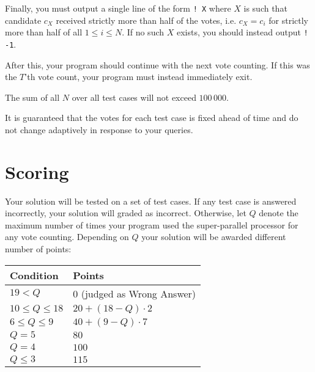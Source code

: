 Finally, you must output a single line of the form \texttt{! X} where $X$ is such that candidate $c_X$ received strictly more than half of the votes, i.e. $c_X = c_i$ for strictly more than half of all $1 \le i \le N$.
If no such $X$ exists, you should instead output \texttt{! -1}.

After this, your program should continue with the next vote counting.
If this was the $T$'th vote count, your program must instead immediately exit.

The sum of all $N$ over all test cases will not exceed $100\,000$.

It is guaranteed that the votes for each test case is fixed ahead of time and do not change adaptively in response to your queries.

\section*{Scoring}
Your solution will be tested on a set of test cases.
If any test case is answered incorrectly, your solution will graded as incorrect.
Otherwise, let $Q$ denote the maximum number of times your program used the super-parallel processor for any vote counting.
Depending on $Q$ your solution will be awarded different number of points:

\begin{center}
\begin{tabular}{|l|l|}
    \hline
    \textbf{Condition} & \textbf{Points} \\ \hline
    $19 < Q$ & $0$ (judged as Wrong Answer)\\ \hline
    $10 \le Q \le 18$ & $20 + (18 - Q) \cdot 2$ \\ \hline
    $6 \le Q \le 9$ & $40 + (9 - Q) \cdot 7$ \\ \hline
    $Q = 5$ & $80$ \\ \hline
    $Q = 4$ & $100$ \\ \hline
    $Q \le 3$ & $115$ \\ \hline
\end{tabular}
\end{center}
